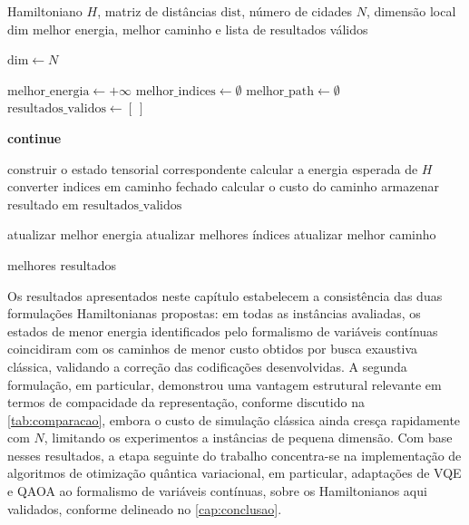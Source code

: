 \begin{algorithm}[!htbp]
\caption{Análise dos estados da base computacional}
\label{alg:analisar_estados_base}
\begin{algorithmic}[1]
\Require Hamiltoniano $H$, matriz de distâncias $\mathrm{dist}$, número de cidades $N$, dimensão local $\mathrm{dim}$
\Ensure melhor energia, melhor caminho e lista de resultados válidos

    \State $\mathrm{dim} \gets N$
\EndIf

\State $\mathrm{melhor\_energia} \gets +\infty$
\State $\mathrm{melhor\_indices} \gets \emptyset$
\State $\mathrm{melhor\_path} \gets \emptyset$
\State $\mathrm{resultados\_validos} \gets [\ ]$

        \State \textbf{continue}
    \EndIf

    \State construir o estado tensorial correspondente
    \State calcular a energia esperada de $H$
    \State converter $\mathrm{indices}$ em caminho fechado
    \State calcular o custo do caminho
    \State armazenar resultado em $\mathrm{resultados\_validos}$

        \State atualizar melhor energia
        \State atualizar melhores índices
        \State atualizar melhor caminho
    \EndIf
\EndFor

\State \Return melhores resultados
\end{algorithmic}
\end{algorithm}

Os resultados apresentados neste capítulo estabelecem a consistência das duas formulações Hamiltonianas propostas: em todas as instâncias avaliadas, os estados de menor energia identificados pelo formalismo de variáveis contínuas coincidiram com os caminhos de menor custo obtidos por busca exaustiva clássica, validando a correção das codificações desenvolvidas. A segunda formulação, em particular, demonstrou uma vantagem estrutural relevante em termos de compacidade da representação, conforme discutido na \autoref{tab:comparacao}, embora o custo de simulação clássica ainda cresça rapidamente com $N$, limitando os experimentos a instâncias de pequena dimensão. Com base nesses resultados, a etapa seguinte do trabalho concentra-se na implementação de algoritmos de otimização quântica variacional, em particular, adaptações de VQE e QAOA ao formalismo de variáveis contínuas, sobre os Hamiltonianos aqui validados, conforme delineado no \autoref{cap:conclusao}.